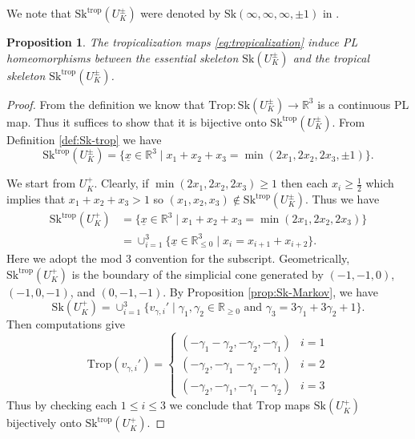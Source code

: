 \documentclass[reqno, 12pt]{amsart}
\newtheorem{prop}{Proposition}[section]
\theoremstyle{definition}
\newcommand{\bR}{\mathbb{R}}
\newcommand{\Trop}{\mathrm{Trop}}
\newcommand{\trop}{\mathrm{trop}}
\newcommand{\Sk}{\mathrm{Sk}}
\newcommand{\ux}{\underline{x}}
\numberwithin{equation}{section}
\begin{document}
We note that $\Sk^{\trop}(U_K^{\pm})$ were denoted by $\Sk(\infty,\infty,\infty, \pm 1)$ in \cite{Jan23}. 

\begin{prop}\label{prop:trop-Sk}
The tropicalization maps \eqref{eq:tropicalization} induce PL homeomorphisms between the essential skeleton $\Sk(U_K^{\pm})$ and the tropical skeleton $\Sk^{\trop}(U_K^{\pm})$.
\end{prop}

\begin{proof} 
From the definition we know that $\Trop:\Sk(U_K^{\pm}) \to \bR^3$ is a continuous PL map. Thus it suffices to show that it is bijective onto $\Sk^{\trop}(U_K^{\pm})$. From Definition \ref{def:Sk-trop} we have 
\[
\Sk^{\trop}(U_K^{\pm}) = \{\ux\in  \bR^3\mid x_1+x_2+x_3=\min(2x_1, 2x_2, 2x_3, \pm 1)\}.
\]

We start from $U_K^+$. Clearly, if $\min(2x_1, 2x_2, 2x_3) \geq 1$ then each $x_i\geq \frac{1}{2}$ which implies that $x_1+x_2+x_3 >1$ so $(x_1,x_2,x_3)\not\in \Sk^{\trop}(U_K^{\pm})$. Thus we have 
\begin{align*}
\Sk^{\trop}(U_K^+) & = \{\ux\in  \bR^3\mid x_1+x_2+x_3 =  \min(2x_1,2x_2,2x_3)\}\\
& = \cup_{i=1}^3 \{\ux\in  \bR_{\leq 0}^3\mid x_i = x_{i+1}+x_{i+2}\}.
\end{align*}
Here we adopt the mod $3$ convention for the subscript. Geometrically, $\Sk^{\trop}(U_K^+)$ is the boundary of the simplicial cone generated by $(-1,-1,0)$, $(-1,0,-1)$, and $(0,-1,-1)$.
By Proposition \ref{prop:Sk-Markov}, we have
\[
\Sk(U_K^{+}) = \cup_{i=1}^3 \{v_{\gamma,i}'\mid \gamma_1,\gamma_2\in \bR_{\geq 0}\textrm{ and }\gamma_3=3\gamma_1+3\gamma_2+1\}.
\]
Then computations give
\[
\Trop(v_{\gamma,i}') =\begin{cases}
(-\gamma_1 - \gamma_2, -\gamma_2, -\gamma_1)& i = 1\\
(-\gamma_2, -\gamma_1-\gamma_2, -\gamma_1) & i = 2\\
(-\gamma_2, -\gamma_1, -\gamma_1-\gamma_2) & i = 3
\end{cases}
\]
Thus by checking each $1\leq i\leq 3$ we conclude that $\Trop$ maps $\Sk(U_K^+)$ bijectively onto $\Sk^{\trop}(U_K^+)$.


\end{proof}
\end{document}
